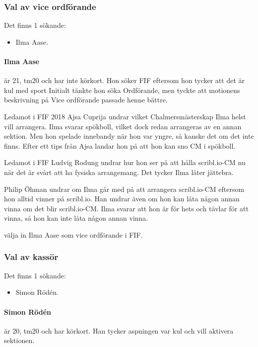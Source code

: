 \documentclass[hidelinks]{sektionsmote}
\begin{document}
\subsubsection{Val av vice ordförande}
Det finns 1 sökande:
\begin{itemize}
    \item Ilma Aase.
\end{itemize}

\paragraph{Ilma Aase} är 21, tm20 och har inte körkort.
Hon söker FIF eftersom hon tycker att det är kul med sport
Initialt tänkte hon söka Ordförande, men tyckte att motionens beskrivning på Vice ordförande passade henne bättre.

Ledamot i FIF 2018 Ajsa Cuprija undrar vilket Chalmersmästerskap Ilma helst vill arrangera.
Ilma svarar spökboll, vilket dock redan arrangeras av en annan sektion.
Men hon spelade innebandy när hon var yngre, så kanske det om det inte finns.
Efter ett tips från Ajsa landar hon på att hon kan sno CM i spökboll.

Ledamot i FIF Ludvig Rodung undrar hur hon ser på att hålla scribl.io-CM nu när det är svårt att ha fysiska arrangemang.
Det tycker Ilma låter jättebra.

Philip Öhman undrar om Ilma går med på att arrangera scribl.io-CM eftersom hon alltid vinner på scribl.io.
Han undrar även om hon kan låta någon annan vinna om det blir scribl.io-CM.
Ilma svarar att hon är för hets och tävlar för att vinna, så hon kan inte låta någon annan vinna.

\begin{beslut}
  \item välja in Ilma Aase som vice ordförande i FIF.
\end{beslut}


\subsubsection{Val av kassör}
Det finns 1 sökande:
\begin{itemize}
    \item Simon Rödén.
\end{itemize}

\paragraph{Simon Rödén} är 20, tm20 och har körkort.
Han tycker aspningen var kul och vill aktivera sektionen.
\end{document}
